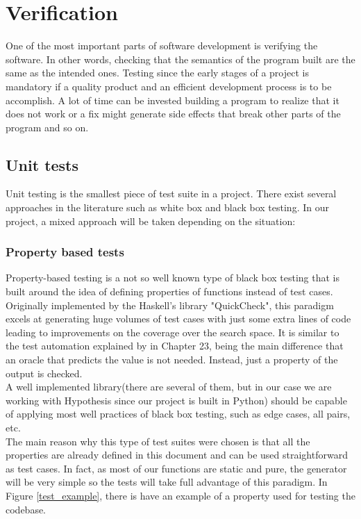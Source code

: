 \section{Verification}
  One of the most important parts of software development is verifying the
  software. In other words, checking that the semantics of the program built
  are the same as the intended ones. Testing since the early stages of a project
  is mandatory if a quality product and an efficient development
  process is to be accomplish.  A lot of time can be invested building a
  program to realize that it does not work or a fix might generate side effects that break other
  parts of the program and so on. 
  \subsection{Unit tests}

    Unit testing is the smallest piece of test suite in a project. There exist
    several approaches in the literature such as white box and black box
    testing. In our project, a mixed approach will be taken depending on the
    situation:

    \subsubsection{Property based tests}

    Property-based testing is a not so well known type of black box testing that
    is built around the idea of defining properties of functions instead of
    test cases. Originally implemented by the Haskell's library
    "QuickCheck"\cite{QuickCheck}, this paradigm excels at generating huge
    volumes of test cases with just some extra lines of code leading
    to improvements on the coverage over the search space. It is similar to the
    test automation explained by \citet{Sommerville} in Chapter 23, being the
    main difference that an oracle that predicts the value is not needed.
    Instead, just a property of the output is checked.\\

    A well implemented library(there are several of them, but in our case we are
    working with Hypothesis\cite{Hypothesis} since our project is built in
    Python) should be capable of applying most well practices of black box
    testing, such as edge cases, all pairs, etc.\\

    The main reason why this type of test suites were chosen is that all the
    properties are already defined in this document and can be used
    straightforward as test cases. In fact, as most of our functions
    are static and pure, the generator will be very simple so the
    tests will take full advantage of this paradigm. In Figure \ref{test_example},
    there is have an example of a property used for testing the codebase.\\

